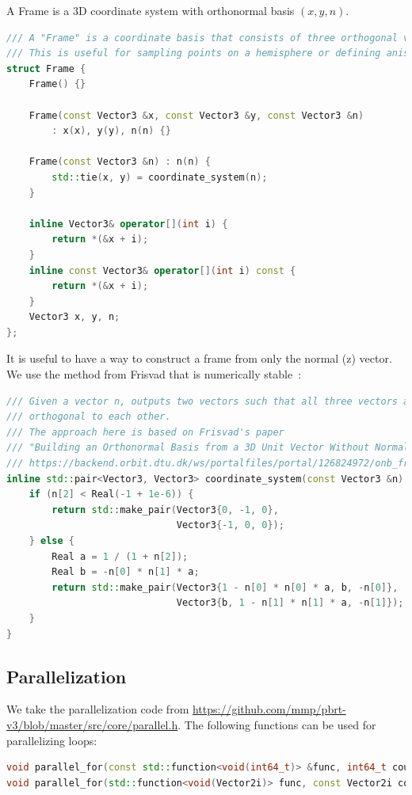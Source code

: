 \documentclass{article}
\begin{document}
A Frame is a 3D coordinate system with orthonormal basis $(x, y, n)$.
\begin{lstlisting}[language=c++]
/// A "Frame" is a coordinate basis that consists of three orthogonal vectors.
/// This is useful for sampling points on a hemisphere or defining anisotropic BSDFs.
struct Frame {
    Frame() {}

    Frame(const Vector3 &x, const Vector3 &y, const Vector3 &n)
        : x(x), y(y), n(n) {}

    Frame(const Vector3 &n) : n(n) {
        std::tie(x, y) = coordinate_system(n);
    }

    inline Vector3& operator[](int i) {
        return *(&x + i);
    }
    inline const Vector3& operator[](int i) const {
        return *(&x + i);
    }
    Vector3 x, y, n;
};
\end{lstlisting}

It is useful to have a way to construct a frame from only the normal (z) vector. We use the method
from Frisvad that is numerically stable~\cite{Frisvad:2012:BOB}:
\begin{lstlisting}[language=c++]
/// Given a vector n, outputs two vectors such that all three vectors are
/// orthogonal to each other.
/// The approach here is based on Frisvad's paper
/// "Building an Orthonormal Basis from a 3D Unit Vector Without Normalization"
/// https://backend.orbit.dtu.dk/ws/portalfiles/portal/126824972/onb_frisvad_jgt2012_v2.pdf
inline std::pair<Vector3, Vector3> coordinate_system(const Vector3 &n) {
    if (n[2] < Real(-1 + 1e-6)) {
        return std::make_pair(Vector3{0, -1, 0},
                              Vector3{-1, 0, 0});
    } else {
        Real a = 1 / (1 + n[2]);
        Real b = -n[0] * n[1] * a;
        return std::make_pair(Vector3{1 - n[0] * n[0] * a, b, -n[0]},
                              Vector3{b, 1 - n[1] * n[1] * a, -n[1]});
    }
}
\end{lstlisting}

\subsection{Parallelization}
We take the parallelization code from \href{pbrt}{https://github.com/mmp/pbrt-v3/blob/master/src/core/parallel.h}. The following functions can be used for parallelizing loops:
\begin{lstlisting}[language=c++]
void parallel_for(const std::function<void(int64_t)> &func, int64_t count, int64_t chunkSize = 1);
void parallel_for(std::function<void(Vector2i)> func, const Vector2i count);
\end{lstlisting}
\end{document}
